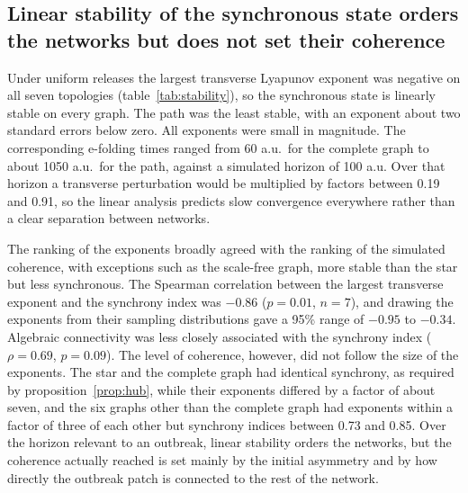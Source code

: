 \subsection{Linear stability of the synchronous state orders the networks but does not set their coherence}
\label{sec:res-stability}

Under uniform releases the largest transverse Lyapunov exponent was negative on all seven topologies (table~\ref{tab:stability}), so the synchronous state is linearly stable on every graph. The path was the least stable, with an exponent about two standard errors below zero. All exponents were small in magnitude. The corresponding e-folding times ranged from 60 a.u.\ for the complete graph to about 1050 a.u.\ for the path, against a simulated horizon of 100 a.u. Over that horizon a transverse perturbation would be multiplied by factors between 0.19 and 0.91, so the linear analysis predicts slow convergence everywhere rather than a clear separation between networks.

The ranking of the exponents broadly agreed with the ranking of the simulated coherence, with exceptions such as the scale-free graph, more stable than the star but less synchronous. The Spearman correlation between the largest transverse exponent and the synchrony index was $-0.86$ ($p = 0.01$, $n = 7$), and drawing the exponents from their sampling distributions gave a 95\% range of $-0.95$ to $-0.34$. Algebraic connectivity was less closely associated with the synchrony index ($\rho = 0.69$, $p = 0.09$). The level of coherence, however, did not follow the size of the exponents. The star and the complete graph had identical synchrony, as required by proposition~\ref{prop:hub}, while their exponents differed by a factor of about seven, and the six graphs other than the complete graph had exponents within a factor of three of each other but synchrony indices between 0.73 and 0.85. Over the horizon relevant to an outbreak, linear stability orders the networks, but the coherence actually reached is set mainly by the initial asymmetry and by how directly the outbreak patch is connected to the rest of the network.

